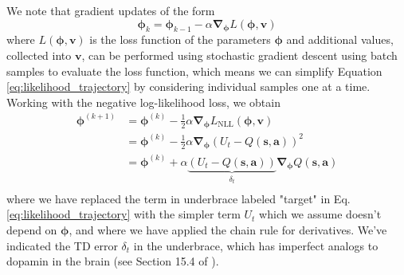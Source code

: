 \documentclass{article}
\begin{document}
We note that gradient updates of the form 
\begin{equation}\label{eq:simple_gradient_update}
\boldsymbol{\phi}_{k}=\boldsymbol{\phi}_{k-1}-\alpha \boldsymbol{\nabla}_{\boldsymbol{\phi}}L(\boldsymbol{\phi},\mathbf{v})
\end{equation}where $L(\boldsymbol{\phi},\mathbf{v})$ is the loss function of the parameters $\boldsymbol{\phi}$ and additional values, collected into $\mathbf{v}$, can be performed using stochastic gradient descent using batch samples to evaluate the loss function, which means we can simplify Equation \ref{eq:likelihood_trajectory} by considering individual samples one at a time. Working with the negative log-likelihood loss, we obtain \begin{equation}\label{eq:semi_gradient}\begin{split}
\boldsymbol{\phi}^{(k+1)}&=\boldsymbol{\phi}^{(k)}-\frac{1}{2}\alpha \boldsymbol{\nabla}_{\boldsymbol{\phi}}L_\text{NLL}(\boldsymbol{\phi},\mathbf{v})\\&=\boldsymbol{\phi}^{(k)}-\frac{1}{2}\alpha \boldsymbol{\nabla}_{\boldsymbol{\phi}}\left(U_t-Q(\mathbf{s},\mathbf{a})\right)^2\\&=\boldsymbol{\phi}^{(k)}+\alpha \underbrace{\left(U_t-Q(\mathbf{s},\mathbf{a})\right)}_{\delta_t}\boldsymbol{\nabla}_{\boldsymbol{\phi}}Q(\mathbf{s},\mathbf{a})\\\end{split}\end{equation} where we have replaced the term in underbrace labeled "target" in Eq. \ref{eq:likelihood_trajectory} with the simpler term $U_t$ which we assume doesn't depend on $\boldsymbol{\phi}$, and where we have applied the chain rule for derivatives. We've indicated the TD error $\delta_t$ in the underbrace, which has imperfect analogs to dopamin in the brain (see Section 15.4 of \cite{sutton_barto_rl}).
\end{document}
